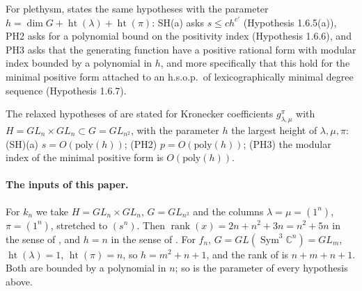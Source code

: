 \documentclass[11pt,a4paper]{article}
\theoremstyle{definition}
\newcommand{\C}{\mathbb{C}}
\newcommand{\Sym}{\operatorname{Sym}}
\newcommand{\rank}{\operatorname{rank}}
\begin{document}
For plethysm, \cite[Section 1.6, pp.~24--25]{GCT6} states the same hypotheses
with the parameter $h=\dim G+\operatorname{ht}(\lambda)+\operatorname{ht}(\pi)$:
SH(a) asks $s\le ch^{c'}$ (Hypothesis 1.6.5(a)), PH2 asks for a polynomial
bound on the positivity index (Hypothesis 1.6.6), and PH3 asks that the
generating function have a positive rational form with modular index bounded
by a polynomial in $h$, and more specifically that this hold for the minimal
positive form attached to an h.s.o.p.\ of lexicographically minimal degree
sequence (Hypothesis 1.6.7).

The relaxed hypotheses of \cite[Appendix, pp.~19--20]{BOR} are stated for
Kronecker coefficients $g_{\lambda,\mu}^{\pi}$ with $H=GL_n\times GL_n\subset
G=GL_{n^2}$, with the parameter $h$ the largest height of $\lambda,\mu,\pi$:
(SH)(a) $s=O(\mathrm{poly}(h))$; (PH2) $p=O(\mathrm{poly}(h))$; (PH3) the
modular index of the minimal positive form is $O(\mathrm{poly}(h))$.

\paragraph{The inputs of this paper.}
For $k_n$ we take $H=GL_n\times GL_n$, $G=GL_{n^2}$ and the columns
$\lambda=\mu=(1^n)$, $\pi=(1^n)$, stretched to $(s^n)$. Then $\rank(x)=2n+n^2+3n
=n^2+5n$ in the sense of \cite[Section 3.4]{GCT6}, and $h=n$ in the sense of
\cite[Appendix]{BOR}. For $f_n$, $G=GL(\Sym^3\C^n)=GL_m$, $\operatorname{ht}
(\lambda)=1$, $\operatorname{ht}(\pi)=n$, so $h=m^2+n+1$, and the rank of
\cite[Section 3.4]{GCT6} is $n+m+n+1$. Both are bounded by a polynomial in
$n$; so is the parameter of every hypothesis above.
\end{document}

